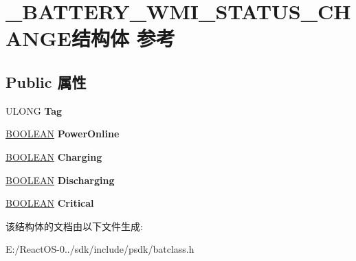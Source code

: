\hypertarget{struct___b_a_t_t_e_r_y___w_m_i___s_t_a_t_u_s___c_h_a_n_g_e}{}\section{\+\_\+\+B\+A\+T\+T\+E\+R\+Y\+\_\+\+W\+M\+I\+\_\+\+S\+T\+A\+T\+U\+S\+\_\+\+C\+H\+A\+N\+G\+E结构体 参考}
\label{struct___b_a_t_t_e_r_y___w_m_i___s_t_a_t_u_s___c_h_a_n_g_e}
\subsection*{Public 属性}
\begin{DoxyCompactItemize}
\item 
\mbox{\label{struct___b_a_t_t_e_r_y___w_m_i___s_t_a_t_u_s___c_h_a_n_g_e_a40dd552372d7c7eb106e6ca301912c5e}} 
U\+L\+O\+NG {\bfseries Tag}
\item 
\mbox{\label{struct___b_a_t_t_e_r_y___w_m_i___s_t_a_t_u_s___c_h_a_n_g_e_a26ecb56c2dd00e9a613d9dea73c1941c}} 
\hyperlink{_processor_bind_8h_a112e3146cb38b6ee95e64d85842e380a}{B\+O\+O\+L\+E\+AN} {\bfseries Power\+Online}
\item 
\mbox{\label{struct___b_a_t_t_e_r_y___w_m_i___s_t_a_t_u_s___c_h_a_n_g_e_a23c5f8829b9ce5830a1c1ad577e44d60}} 
\hyperlink{_processor_bind_8h_a112e3146cb38b6ee95e64d85842e380a}{B\+O\+O\+L\+E\+AN} {\bfseries Charging}
\item 
\mbox{\label{struct___b_a_t_t_e_r_y___w_m_i___s_t_a_t_u_s___c_h_a_n_g_e_adf30d1757395b51d916e307379e8bbd3}} 
\hyperlink{_processor_bind_8h_a112e3146cb38b6ee95e64d85842e380a}{B\+O\+O\+L\+E\+AN} {\bfseries Discharging}
\item 
\mbox{\label{struct___b_a_t_t_e_r_y___w_m_i___s_t_a_t_u_s___c_h_a_n_g_e_a0c609550469b9aafed5a0a31e5b6d7df}} 
\hyperlink{_processor_bind_8h_a112e3146cb38b6ee95e64d85842e380a}{B\+O\+O\+L\+E\+AN} {\bfseries Critical}
\end{DoxyCompactItemize}


该结构体的文档由以下文件生成\+:\begin{DoxyCompactItemize}
\item 
E\+:/\+React\+O\+S-\/0../sdk/include/psdk/batclass.\+h\end{DoxyCompactItemize}
